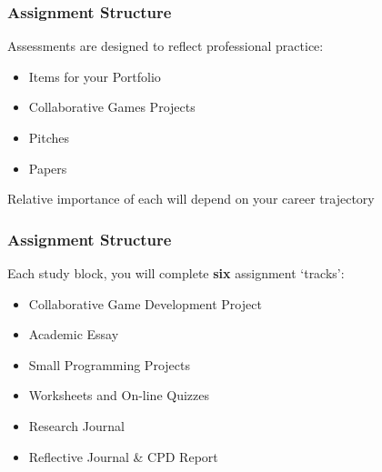 \begin{frame}
	\frametitle{Assignment Structure}
	
	
	Assessments are designed to reflect professional practice:
	
	\begin{itemize}
		\item Items for your Portfolio
		\item Collaborative Games Projects
		\item Pitches
		\item Papers
	\end{itemize}

	Relative importance of each will depend on your career trajectory

\end{frame}











\begin{frame}
	\frametitle{Assignment Structure}
	
	Each study block, you will complete \textbf{six} assignment `tracks':
	
	\begin{itemize}
		\item Collaborative Game Development Project
		\item Academic Essay
		\item Small Programming Projects
		\item Worksheets and On-line Quizzes
		\item Research Journal
		\item Reflective Journal \& CPD Report
	\end{itemize}

\end{frame}

